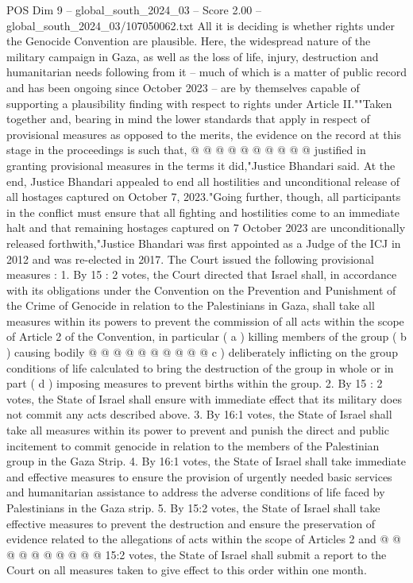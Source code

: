 \begin{textsample}{POS Dim 9 – global\_south\_2024\_03 – Score 2.00 – global\_south\_2024\_03/107050062.txt}
All it is deciding is whether rights under the Genocide Convention are plausible.
Here, the widespread nature of the military campaign in Gaza, as well as the loss of life, injury, destruction and humanitarian needs following from it -- much of which is a matter of public record and has been ongoing since October 2023 -- are by themselves capable of supporting a plausibility finding with respect to rights under Article II.""Taken together and, bearing in mind the lower standards that apply in respect of provisional measures as opposed to the merits, the evidence on the record at this stage in the proceedings is such that, @ @ @ @ @ @ @ @ @ @ justified in granting provisional measures in the terms it did,"Justice Bhandari said.
At the end, Justice Bhandari appealed to end all hostilities and unconditional release of all hostages captured on October 7, 2023."Going further, though, all participants in the conflict must ensure that all fighting and hostilities come to an immediate halt and that remaining hostages captured on 7 October 2023 are unconditionally released forthwith,"Justice Bhandari was first appointed as a Judge of the ICJ in 2012 and was re-elected in 2017.
The Court issued the following provisional measures : 1.
By 15 : 2 votes, the Court directed that Israel shall, in accordance with its obligations under the Convention on the Prevention and Punishment of the Crime of Genocide in relation to the Palestinians in Gaza, shall take all measures within its powers to prevent the commission of all acts within the scope of Article 2 of the Convention, in particular ( a ) killing members of the group ( b ) causing bodily @ @ @ @ @ @ @ @ @ @ c ) deliberately inflicting on the group conditions of life calculated to bring the destruction of the group in whole or in part ( d ) imposing measures to prevent births within the group. 2.
By 15 : 2 votes, the State of Israel shall ensure with immediate effect that its military does not commit any acts described above. 3.
By 16:1 votes, the State of Israel shall take all measures within its power to prevent and punish the direct and public incitement to commit genocide in relation to the members of the Palestinian group in the Gaza Strip. 4.
By 16:1 votes, the State of Israel shall take immediate and effective measures to ensure the provision of urgently needed basic services and humanitarian assistance to address the adverse conditions of life faced by Palestinians in the Gaza strip. 5.
By 15:2 votes, the State of Israel shall take effective measures to prevent the destruction and ensure the preservation of evidence related to the allegations of acts within the scope of Articles 2 and @ @ @ @ @ @ @ @ @ @ 15:2 votes, the State of Israel shall submit a report to the Court on all measures taken to give effect to this order within one month.

\end{textsample}
